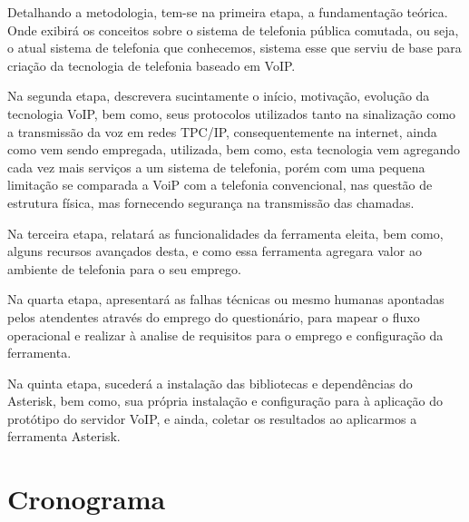 Detalhando a metodologia, tem-se na primeira etapa, a fundamentação teórica. Onde exibirá os conceitos sobre o sistema de telefonia pública comutada, ou seja, o atual sistema de telefonia que conhecemos, sistema esse que serviu de base para criação da tecnologia de telefonia baseado em VoIP.

	Na segunda etapa, descrevera sucintamente o início, motivação, evolução da tecnologia VoIP, bem como, seus protocolos utilizados tanto na sinalização como a transmissão da voz em redes TPC/IP, consequentemente na internet, ainda como vem sendo empregada, utilizada, bem como, esta tecnologia vem agregando cada vez mais serviços a um sistema de telefonia, porém com uma pequena limitação se comparada a VoiP com a telefonia convencional, nas questão de estrutura física, mas fornecendo segurança na transmissão das chamadas.

	Na  terceira etapa, relatará as funcionalidades da ferramenta eleita, bem como, alguns recursos avançados desta, e como essa ferramenta agregara valor ao ambiente de telefonia para o seu emprego.

	Na quarta etapa, apresentará as falhas técnicas ou mesmo humanas apontadas pelos atendentes através do emprego do questionário, para mapear o fluxo operacional e realizar à analise de requisitos para o emprego e configuração da ferramenta.

	Na quinta etapa, sucederá a instalação das bibliotecas e dependências do Asterisk, bem como, sua própria instalação e configuração para à aplicação do protótipo do servidor VoIP, e ainda, coletar os resultados ao aplicarmos a ferramenta Asterisk.


\newpage
\section{Cronograma}
\thispagestyle{empty}

